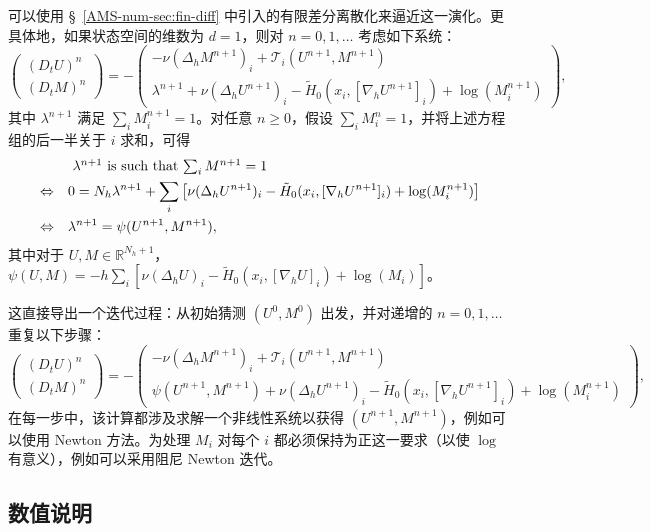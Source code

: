 \documentclass{amsproc}
\theoremstyle{definition}
\theoremstyle{remark}
\numberwithin{equation}{section}
\newcommand{\RR}{{\mathbb R}}
\newcommand{\grad}{\nabla}
\begin{document}
可以使用 \S~\ref{AMS-num-sec:fin-diff} 中引入的有限差分离散化来逼近这一演化。更具体地，如果状态空间的维数为 $d=1$，则对 $n=0,1,\dots$ 考虑如下系统：
$$
	\begin{pmatrix}
	(D_t U)^n
	\\
	(D_t M)^n
	\end{pmatrix} 
	=
	- \begin{pmatrix}
	 -\nu (\Delta_h M^{n+1})_{i}
	+ \mathcal{T}_i(U^{n+1}, M^{n+1})
	\\
	\lambda^{n+1} + \nu (\Delta_h U^{n+1})_{i}
	- \tilde{H}_0(x_i, [\grad_h U^{n+1}]_i) 
	+ \log(M^{n+1}_i)
	\end{pmatrix},
$$
其中 $\lambda^{n+1}$ 满足 $\sum_i M^{n+1}_i = 1$。对任意 $n \ge 0$，假设 $\sum_i M^{n}_i = 1$，并将上述方程组的后一半关于 $i$ 求和，可得
\begin{align*}
	& \hbox{ $\lambda^{n+1}$ is such that $\sum_i M^{n+1} = 1$} 
	\\
	\Leftrightarrow \quad
	&0 = N_h \lambda^{n+1} + \sum_{i}  \left[ \nu (\Delta_h U^{n+1})_{i}
	- \tilde{H}_0(x_i, [\grad_h U^{n+1}]_i) 
	+ \log(M^{n+1}_i) \right]
	\\
	\Leftrightarrow \quad 
	&\lambda^{n+1} = \psi(U^{n+1}, M^{n+1}),
\end{align*}
其中对于 $U, M \in \RR^{N_h+1}$，$\psi(U, M) = - h \sum_{i}  \left[ \nu (\Delta_h U)_{i}
	- \tilde{H}_0(x_i, [\grad_h U]_i) 
	+ \log(M_i) \right]$。
	
这直接导出一个迭代过程：从初始猜测 $(U^0, M^0)$ 出发，并对递增的 $n=0,1,\dots$ 重复以下步骤：
\begin{equation}
\label{AMS-num-eq:monotoneop-discrete-flow}
	\begin{pmatrix}
	(D_t U)^n
	\\
	(D_t M)^n
	\end{pmatrix} 
	=
	- \begin{pmatrix}
	 -\nu (\Delta_h M^{n+1})_{i}
	+ \mathcal{T}_i(U^{n+1}, M^{n+1})
	\\
	\psi(U^{n+1}, M^{n+1}) + \nu (\Delta_h U^{n+1})_{i}
	- \tilde{H}_0(x_i, [\grad_h U^{n+1}]_i) 
	+ \log(M^{n+1}_i)
	\end{pmatrix},
\end{equation}
在每一步中，该计算都涉及求解一个非线性系统以获得 $(U^{n+1}, M^{n+1})$，例如可以使用 Newton 方法。为处理 $M_i$ 对每个 $i$ 都必须保持为正这一要求（以使 $\log$ 有意义），例如可以采用阻尼 Newton 迭代。 


\subsection{数值说明}
\end{document}

